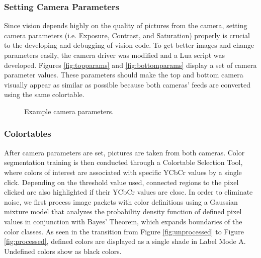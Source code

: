 \documentclass{article}
\begin{document}
    \subsubsection{Setting Camera Parameters}
      Since vision depends highly on the quality of pictures from the camera, setting camera parameters (i.e. Exposure, Contrast, and Saturation) properly is crucial to the developing and debugging of vision code. To get better images and change parameters easily, the camera driver was modified and a Lua script was developed. Figures \ref{fig:topparams} and \ref{fig:bottomparams} display a set of camera parameter values. These parameters should make the top and bottom camera visually appear as similar as possible because both cameras’ feeds are converted using the same colortable.
 	    \begin{figure}[H]
    		\centering
		    \quad
		    \quad
    		\caption{Example camera parameters.}	
	    \end{figure}

	  \subsubsection{Colortables}
	    After camera parameters are set, pictures are taken from both cameras. Color segmentation training is then conducted through a Colortable Selection Tool, where colors of interest are associated with specific YCbCr values by a single click. Depending on the threshold value used, connected regions to the pixel clicked are also highlighted if their YCbCr values are close.
	In order to eliminate noise, we first process image packets with color definitions using a Gaussian mixture model that analyzes the probability density function of defined pixel values in conjunction with Bayes' Theorem, which expands boundaries of the color classes. As seen in the transition from Figure \ref{fig:unprocessed} to Figure \ref{fig:processed}, defined colors are displayed as a single shade in Label Mode A. Undefined colors show as black colors.
	
\end{document}
